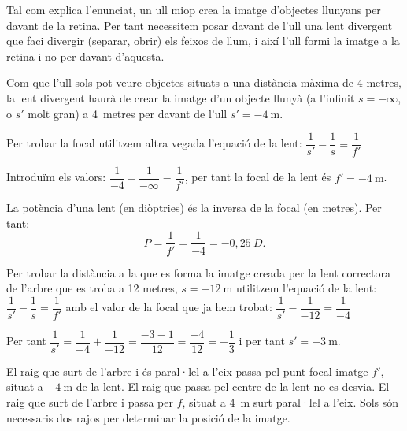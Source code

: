 \begin{solapartat}
 Tal com explica l'enunciat, un ull miop crea la imatge d'objectes llunyans per davant de la retina. Per tant necessitem posar davant de l'ull una lent divergent que faci divergir (separar, obrir) els feixos de llum, i així l'ull formi la imatge a la retina i no per davant d'aquesta.

 Com que l'ull sols pot veure objectes situats a una distància màxima de 4 metres, la lent divergent haurà de crear la imatge d'un objecte llunyà (a l'infinit $s = -\infty$, o $s'$ molt gran) a 4~metres per davant de l'ull $s' = -4\ \mathrm{m}$.

 Per trobar la focal utilitzem altra vegada l'equació de la lent: $\dfrac{1}{s'} - \dfrac{1}{s} = \dfrac{1}{f'}$

 Introduïm els valors: $\dfrac{1}{-4} - \dfrac{1}{-\infty} = \dfrac{1}{f'}$, per tant la focal de la lent és $f' = -4\ \mathrm{m}$.

 La potència d'una lent (en diòptries) és la inversa de la focal (en metres). Per tant:
\[ P = \frac{1}{f'} = \frac{1}{-4} = -0,25\ D. \]
\end{solapartat}

\begin{solapartat}
 Per trobar la distància a la que es forma la imatge creada per la lent correctora de l'arbre que es troba a 12 metres, $s = -12\ \mathrm{m}$ utilitzem l'equació de la lent: $\dfrac{1}{s'} - \dfrac{1}{s} = \dfrac{1}{f'}$ amb el valor de la focal que ja hem trobat: $\dfrac{1}{s'} - \dfrac{1}{-12} = \dfrac{1}{-4}$

 Per tant $\dfrac{1}{s'} = \dfrac{1}{-4} + \dfrac{1}{-12} = \dfrac{-3-1}{12} = \dfrac{-4}{12} = -\dfrac{1}{3}$ i per tant $s' = -3\ \mathrm{m}$.

 El raig que surt de l'arbre i és paral·lel a l'eix passa pel punt focal imatge $f'$, situat a $-4\ \mathrm{m}$ de la lent. El raig que passa pel centre de la lent no es desvia. El raig que surt de l'arbre i passa per $f$, situat a 4~m surt paral·lel a l'eix. Sols són necessaris dos rajos per determinar la posició de la imatge.

\end{solapartat}
